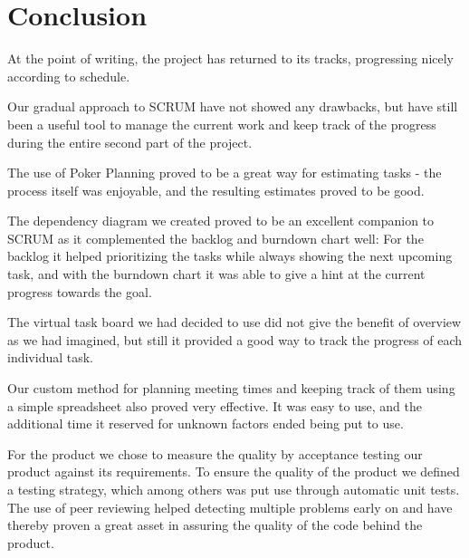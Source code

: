 \section{Conclusion}
At the point of writing, the project has returned to its tracks, progressing nicely according to schedule.

Our gradual approach to SCRUM have not showed any drawbacks, but have still been a useful tool to manage the current work and keep track of the progress during the entire second part of the project.

The use of Poker Planning proved to be a great way for estimating tasks - the process itself was enjoyable, and the resulting estimates proved to be good.

The dependency diagram we created proved to be an excellent companion to SCRUM as it complemented the backlog and burndown chart well: For the backlog it helped prioritizing the tasks while always showing the next upcoming task, and with the burndown chart it was able to give a hint at the current progress towards the goal.

The virtual task board we had decided to use did not give the benefit of overview as we had imagined, but still it provided a good way to track the progress of each individual task.

Our custom method for planning meeting times and keeping track of them using a simple spreadsheet also proved very effective. It was easy to use, and the additional time it reserved for unknown factors ended being put to use.

For the product we chose to measure the quality by acceptance testing our product against its requirements.
To ensure the quality of the product we defined a testing strategy, which among others was put use through automatic unit tests. The use of peer reviewing helped detecting multiple problems early on and have thereby proven a great asset in assuring the quality of the code behind the product.